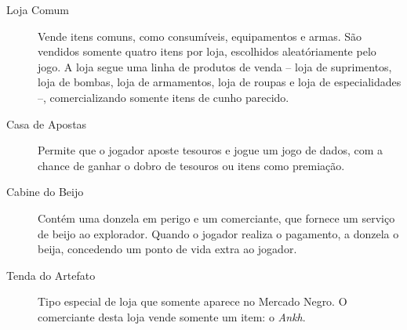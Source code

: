 \begin{description}
	\item[Loja Comum]
		Vende itens comuns, como consumíveis, equipamentos e armas.  São
		vendidos somente quatro itens por loja, escolhidos aleatóriamente pelo
		jogo. A loja segue uma linha de produtos de venda -- loja de
		suprimentos, loja de bombas, loja de armamentos, loja de roupas e loja
		de especialidades --, comercializando somente itens de cunho parecido.
	\item[Casa de Apostas]
		Permite que o jogador aposte tesouros e jogue um jogo de dados, com a
		chance de ganhar o dobro de tesouros ou itens como premiação.
	\item[Cabine do Beijo]
		Contém uma donzela em perigo e um comerciante, que fornece um serviço de
		beijo ao explorador. Quando o jogador realiza o pagamento, a donzela o
		beija, concedendo um ponto de vida extra ao jogador.
	\item[Tenda do Artefato]
		Tipo especial de loja que somente aparece no Mercado Negro. O
		comerciante desta loja vende somente um item: o \textit{Ankh}.
\end{description}

